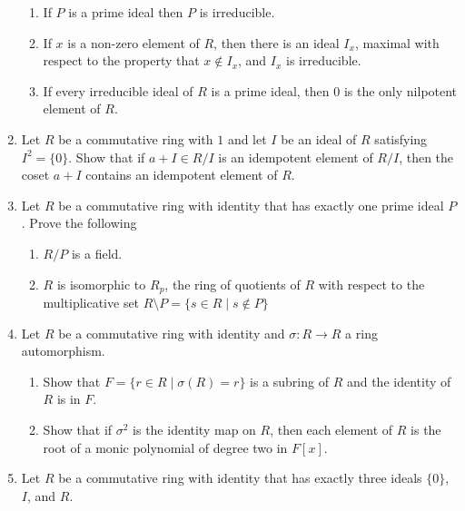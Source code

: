\documentclass{article}
\theoremstyle{definition}
\begin{document}
\begin{enumerate}
            \begin{enumerate}
                \item If $P$ is a prime ideal then $P$ is irreducible.
                \item If $x$ is a non-zero element of $R$, then there is an ideal $I_x$, maximal with respect to the property that $x\notin I_x$, and $I_x$ is irreducible.
                \item If every irreducible ideal of $R$ is a prime ideal, then $0$ is the only nilpotent element of $R$.
            \end{enumerate}

            \item Let $R$ be a commutative ring with $1$ and let $I$ be an ideal of $R$ satisfying $I^2=\{0\}$. Show that if $a+I\in R/I$ is an idempotent element of $R/I$, then the coset $a+I$ contains an idempotent element of $R$.
            
            \item Let $R$ be a commutative ring with identity that has exactly one prime ideal $P$. Prove the following
            
            \begin{enumerate}
                \item $R/P$ is a field.
                \item $R$ is isomorphic to $R_p$, the ring of quotients of $R$ with respect to the multiplicative set $R\setminus P=\{s\in R\mid s\notin P\}$
            \end{enumerate}

            \item Let $R$ be a commutative ring with identity and $\sigma : R\to R$ a ring automorphism.

            \begin{enumerate}
                \item Show that $F=\{r\in R \mid  \sigma (R)=r\}$ is a subring of $R$ and the identity of $R$ is in $F$.
                \item Show that if $\sigma^2$ is the identity map on $R$, then each element of $R$ is the root of a monic polynomial of degree two in $F[x]$.
            \end{enumerate}

            \item Let $R$ be a commutative ring with identity that has exactly three ideals $\{0\}$, $I$, and $R$.
            

\end{enumerate}
\end{document}
